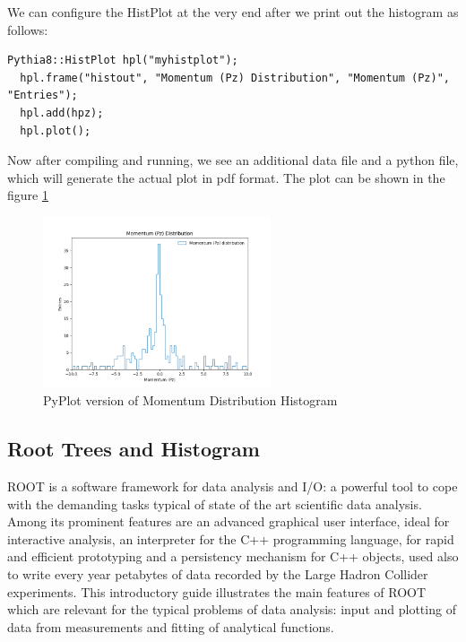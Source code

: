 \documentclass[letterpaper,12pt]{article}
\begin{document}
\begin{spacing}{1.125}
We can configure the HistPlot at the very end after we print out the histogram
as follows:

\begin{lstlisting}[style=python, caption={Configuring Pyplot for Histogram using HistPlot}]
  Pythia8::HistPlot hpl("myhistplot");
  hpl.frame("histout", "Momentum (Pz) Distribution", "Momentum (Pz)", "Entries");
  hpl.add(hpz);
  hpl.plot();
\end{lstlisting}

Now after compiling and running, we see an additional data file and a python
file, which will generate the actual plot in pdf format. The plot can be shown in the figure
\ref{graph-py}

\begin{figure}[!ht]
  \includegraphics[width=0.6\textwidth]{graph-py.png}
  \caption{PyPlot version of Momentum Distribution Histogram}
  \label{graph-py}
\end{figure}



\subsection{Root Trees and Histogram}


ROOT is a software framework for data analysis and I/O: a powerful tool to cope with the
demanding tasks typical of state of the art scientific data analysis. Among its prominent
features are an advanced graphical user interface, ideal for interactive analysis, an
interpreter for the C++ programming language, for rapid and efficient prototyping and a
persistency mechanism for C++ objects, used also to write every year petabytes of data
recorded by the Large Hadron Collider experiments. This introductory guide illustrates
the main features of ROOT which are relevant for the typical problems of data analysis:
input and plotting of data from measurements and fitting of analytical functions.


\end{spacing}
\end{document}
